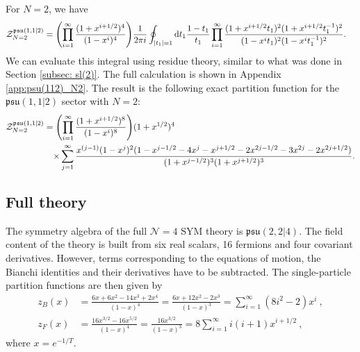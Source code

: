 \documentclass[a4paper,11pt]{article}
\DeclareMathOperator{\phaneq}{\phantom{{}=}}
\begin{document}
For $N=2$, we have
\begin{equation}
\begin{split}
	\mathcal{Z}_{N=2}^{\mathfrak{psu}(1,1|2)} &= \qty(\prod_{i=1}^\infty\frac{(1+x^{i+1/2})^{4}}{(1-x^{i})^4})  
	 \frac{1}{2\pi i}\oint_{|t_1|=1} \dd t_1 \frac{1-t_1}{t_1} \prod_{i=1}^\infty \frac{(1+x^{i+1/2}t_1)^2(1+x^{i+1/2}t_1^{-1})^2}{(1-x^{i}t_1)^2(1-x^{i}t_1^{-1})^2} .
\end{split}
\end{equation}
We can evaluate this integral using residue theory, similar to what was done in Section \ref{subsec: sl(2)}. The full calculation is shown in Appendix \ref{app:psu(112)_N2}. The result is the following exact partition function for the $\mathfrak{psu}(1,1|2)$ sector with $N=2$:
% 
\begin{equation}
\label{eq: psu112 result for N=2}
\begin{split}
	\mathcal{Z}_{N=2}^{\mathfrak{psu}(1,1|2)} &= \qty(\prod_{i=1}^\infty\frac{(1+x^{i+1/2})^{8}}{(1-x^{i})^8}) (1+x^{1/2})^4 \\
	&\!\!\phaneq\times \sum_{j=1}^\infty \frac{x^{(j-1)}(1-x^j)^2 (1-x^{j-1/2}-4x^j-x^{j+1/2}-2x^{2j-1/2}-3x^{2j}-2x^{2j+1/2})}{(1+x^{j-1/2})^3(1+x^{j+1/2})^3}\,\!. 
\end{split}
\end{equation}




\subsection{Full theory}
\label{subsec: psu(224)}

The symmetry algebra of the full $\mathcal{N}=4$ SYM theory is $\mathfrak{psu}(2,2|4)$. The field content of the theory is built from six real scalars, 16 fermions and four covariant derivatives. However, terms corresponding to the equations of motion, the Bianchi identities and their derivatives have to be subtracted. The single-particle partition functions are then given by \cite{Aharony:2003sx}
%
\begin{equation}
\begin{split}
	z_B(x) &= \frac{6x+6x^2-14x^3+2x^4}{(1-x)^4} = \frac{6x+12x^2-2x^3}{(1-x)^3} = \sum_{i=1}^\infty (8i^2-2) x^{i} \ , \\
	z_F(x) &= \frac{16x^{3/2}-16x^{5/2}}{(1-x)^4} = \frac{16x^{3/2}}{(1-x)^3} = 8\sum_{i=1}^\infty i(i+1) x^{i+1/2} \ ,
\end{split}
\end{equation}
%
where $x=e^{-1/T}$. 
\end{document}
